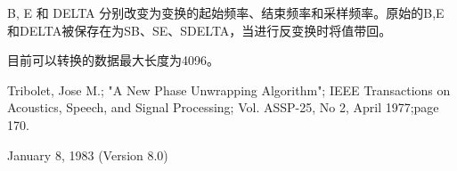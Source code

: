 B, E 和 DELTA 分别改变为变换的起始频率、结束频率和采样频率。原始的B,E和DELTA被保存在为SB、SE、SDELTA，当进行反变换时将值带回。

目前可以转换的数据最大长度为4096。

Tribolet, Jose M.; "A New Phase Unwrapping Algorithm"; IEEE Transactions on Acoustics, 	Speech, and Signal Processing; Vol. ASSP-25, No 2, April 1977;page 170.

January 8, 1983 (Version 8.0)

